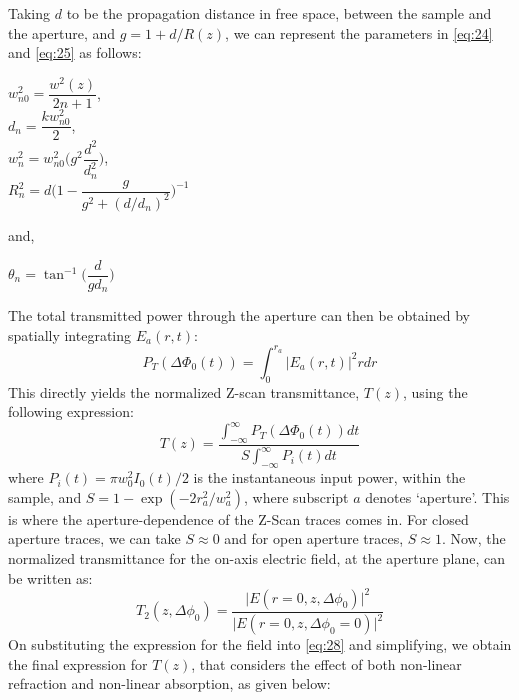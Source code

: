 \documentclass[%
 reprint,
 amsmath,amssymb,
 aps,
]{revtex4-2}
\begin{document}
		\par 
		Taking $ d $ to be the propagation distance in free space, between the sample
		and the aperture, and $ g = 1 + d/R(z) $, we can represent the parameters in
		\eqref{eq:24} and \eqref{eq:25} as follows:
		\begin{center}
			$ w_{n0}^2 = \dfrac{w^2(z)}{2n+1}$, \\

			$ d_n = \dfrac{kw_{n0}^2}{2} $, \\

			$ w_n^2 = w^2_{n0} \Bigg( g^2 \dfrac{d^2}{d_n^2} \Bigg)$, \\

			$ R_n^2 = d \Bigg(1-\dfrac{g}{g^2 + (d/d_n)^2}\Bigg)^{-1} $
		\end{center}
		and,
		\begin{center}
			$ \theta_n = \tan^{-1} \Big(\dfrac{d}{gd_n}\Big) $
		\end{center}
		\par 
		The total transmitted power through the aperture can then be obtained
		by spatially integrating $ E_a(r, t) $:
		\begin{equation}\label{key}
			P_T (\Delta \Phi_0 (t)) = \int_{0}^{r_a} |E_a(r,t)|^2 r dr
		\end{equation}
		This directly yields the normalized Z-scan transmittance, $ T(z) $, using the
		following expression:
		\begin{equation}\label{key}
			T(z) = \dfrac{\int_{-\infty}^{\infty} P_T (\Delta \Phi_0 (t)) dt}{S \int_{-\infty}^{\infty} P_i (t) dt}
		\end{equation}
		where $ P_i(t) = \pi w_0^2 I_0 (t)/2 $ is the instantaneous input power, within the sample, and $ S = 1 - \exp(-2r_a^2/w_a^2) $, where subscript $ a $ denotes `aperture'.
		This is where the aperture-dependence of the Z-Scan traces comes in. For
		closed aperture traces, we can take $ S \approx 0 $ and for open aperture traces,
		$ S \approx 1 $. Now, the normalized transmittance for the on-axis electric field, at
		the aperture plane, can be written as:
		\begin{equation}\label{eq:28}
			T_2 (z, \Delta \phi_0) = \dfrac{\Big|E(r=0,z,\Delta \phi_0)\Big|^2}{\Big|E(r=0,z,\Delta \phi_0=0)\Big|^2}
		\end{equation}
		On substituting the expression for the field into \eqref{eq:28} and simplifying, we
		obtain the final expression for $ T(z) $,
		that considers the effect of both non-linear refraction and non-linear absorption, as given below:
\end{document}
